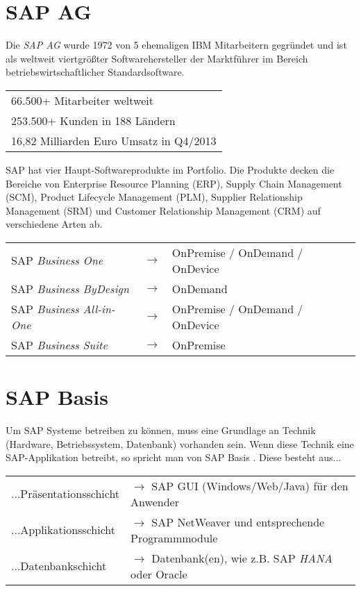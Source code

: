 \documentclass{handout}
\begin{document}
\maketitle

\section{SAP AG}
Die \emph{SAP AG} wurde 1972 von 5 ehemaligen IBM Mitarbeitern gegründet und ist als weltweit viertgrößter Softwarehersteller \cite{SAPFacts} der Marktführer im Bereich betriebswirtschaftlicher Standardsoftware.

\small
\begin{tabular}{L}
66.500+ Mitarbeiter weltweit \cite{SAPAtGlance} \\
253.500+ Kunden in 188 Ländern \cite{SAPAtGlance} \\
16,82 Milliarden Euro Umsatz in Q4/2013 \cite{SAPFacts} \\
\end{tabular}
\normalsize

SAP hat vier Haupt-Softwareprodukte im Portfolio. Die Produkte decken die Bereiche von Enterprise Resource Planning (ERP), Supply Chain Management (SCM), Product Lifecycle Management (PLM), Supplier Relationship Management (SRM) und Customer Relationship Management (CRM) auf verschiedene Arten ab.

\small
\begin{tabular}{L ll}
SAP \emph{Business One} & $\rightarrow$ & OnPremise / OnDemand / OnDevice \\
SAP \emph{Business ByDesign} & $\rightarrow$ & OnDemand \\
SAP \emph{Business All-in-One} & $\rightarrow$ & OnPremise / OnDemand / OnDevice\\
SAP \emph{Business Suite} & $\rightarrow$ & OnPremise \\
\end{tabular}
\normalsize

\section{SAP Basis}
Um SAP Systeme betreiben zu können, muss eine Grundlage an Technik (Hardware, Betriebssystem, Datenbank) vorhanden sein. Wenn diese Technik eine SAP-Applikation betreibt, so spricht man von SAP Basis \cite{SAPTEC}. Diese besteht aus...

\small
\begin{tabular}{L l}
...Präsentationsschicht & $\rightarrow$ SAP GUI (Windows/Web/Java) für den Anwender\\
...Applikationsschicht & $\rightarrow$ SAP NetWeaver und entsprechende Programmmodule\\
...Datenbankschicht & $\rightarrow$ Datenbank(en), wie z.B. SAP \emph{HANA} oder Oracle\\
\end{tabular}
\normalsize
\end{document}
